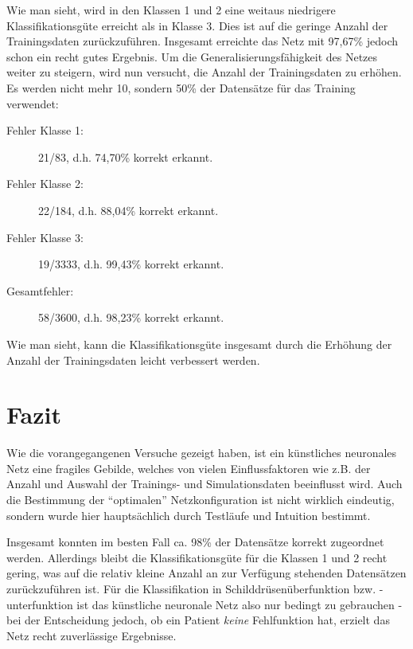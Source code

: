 Wie man sieht, wird in den Klassen 1 und 2 eine weitaus niedrigere 
Klassifikationsgüte erreicht als in Klasse 3. Dies ist auf die geringe Anzahl 
der Trainingsdaten zurückzuführen. Insgesamt erreichte das Netz mit 97,67\% 
jedoch schon ein recht gutes Ergebnis. Um die Generalisierungsfähigkeit des 
Netzes weiter zu steigern, wird nun versucht, die Anzahl der Trainingsdaten zu 
erhöhen. Es werden nicht mehr 10, sondern 50\% der Datensätze für das Training 
verwendet:

\begin{description}
  \item[Fehler Klasse 1:] 21/83, d.h. 74,70\% korrekt erkannt.
  \item[Fehler Klasse 2:] 22/184, d.h. 88,04\% korrekt erkannt.
  \item[Fehler Klasse 3:] 19/3333, d.h. 99,43\% korrekt erkannt.
  \item[Gesamtfehler:] 58/3600, d.h. 98,23\% korrekt erkannt.
\end{description}

Wie man sieht, kann die Klassifikationsgüte insgesamt durch die Erhöhung der
Anzahl der Trainingsdaten leicht verbessert werden. 

\section{Fazit}
Wie die vorangegangenen Versuche gezeigt haben, ist ein künstliches neuronales 
Netz eine fragiles Gebilde, welches von vielen Einflussfaktoren wie z.B. der Anzahl 
und Auswahl der Trainings- und Simulationsdaten beeinflusst wird. Auch die
Bestimmung der "`optimalen"' Netzkonfiguration ist nicht wirklich eindeutig,
sondern wurde hier hauptsächlich durch Testläufe und Intuition bestimmt. 

Insgesamt konnten im besten Fall ca. 98\% der Datensätze korrekt zugeordnet 
werden. Allerdings bleibt die Klassifikationsgüte für die Klassen 1 und 2 recht 
gering, was auf die relativ kleine Anzahl an zur Verfügung stehenden 
Datensätzen zurückzuführen ist. Für die Klassifikation in 
Schilddrüsenüberfunktion bzw. -unterfunktion ist das künstliche neuronale Netz 
also nur bedingt zu gebrauchen - bei der Entscheidung jedoch, ob ein Patient 
\emph{keine} Fehlfunktion hat, erzielt das Netz recht zuverlässige Ergebnisse.
